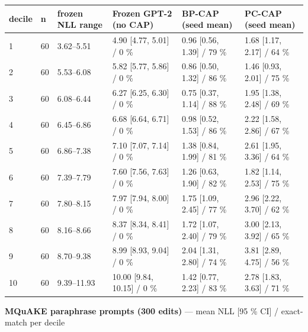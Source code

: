 \documentclass[10pt,a4paper]{article}
\begin{document}
\begin{center}\footnotesize
\begin{tabularx}{\textwidth}{@{}p{}XXXXX@{}}
\toprule
decile & n & frozen NLL range & Frozen GPT-2 (no CAP) & BP-CAP (seed mean) & PC-CAP (seed mean) \\ \midrule
1 & 60 & 3.62–5.51 & 4.90 [4.77, 5.01] / 0 \% & 0.96 [0.56, 1.39] / 79 \% & 1.68 [1.17, 2.17] / 64 \% \\
2 & 60 & 5.53–6.08 & 5.82 [5.77, 5.86] / 0 \% & 0.86 [0.50, 1.32] / 86 \% & 1.46 [0.93, 2.01] / 75 \% \\
3 & 60 & 6.08–6.44 & 6.27 [6.25, 6.30] / 0 \% & 0.75 [0.37, 1.14] / 88 \% & 1.95 [1.38, 2.48] / 69 \% \\
4 & 60 & 6.45–6.86 & 6.68 [6.64, 6.71] / 0 \% & 0.98 [0.52, 1.53] / 86 \% & 2.22 [1.58, 2.86] / 67 \% \\
5 & 60 & 6.86–7.38 & 7.10 [7.07, 7.14] / 0 \% & 1.38 [0.84, 1.99] / 81 \% & 2.61 [1.95, 3.36] / 64 \% \\
6 & 60 & 7.39–7.79 & 7.60 [7.56, 7.63] / 0 \% & 1.26 [0.63, 1.90] / 82 \% & 1.82 [1.14, 2.53] / 75 \% \\
7 & 60 & 7.80–8.15 & 7.97 [7.94, 8.00] / 0 \% & 1.75 [1.09, 2.45] / 77 \% & 2.96 [2.22, 3.70] / 62 \% \\
8 & 60 & 8.16–8.66 & 8.37 [8.34, 8.41] / 0 \% & 1.72 [1.07, 2.40] / 79 \% & 3.00 [2.13, 3.92] / 65 \% \\
9 & 60 & 8.70–9.38 & 8.99 [8.93, 9.04] / 0 \% & 2.04 [1.31, 2.80] / 74 \% & 3.81 [2.89, 4.75] / 56 \% \\
10 & 60 & 9.39–11.93 & 10.00 [9.84, 10.15] / 0 \% & 1.42 [0.77, 2.23] / 83 \% & 2.78 [1.83, 3.63] / 71 \% \\
\bottomrule
\end{tabularx}
\end{center}



\textbf{MQuAKE paraphrase prompts (300 edits)} — mean NLL [95 \% CI] / exact-match per decile
\end{document}
